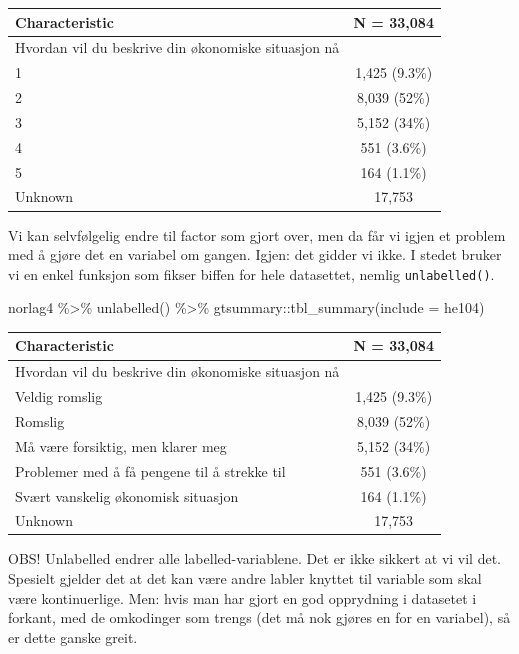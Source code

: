\documentclass[
  letterpaper,
  DIV=11,
  numbers=noendperiod]{scrreprt}
\newenvironment{Shaded}{\begin{snugshade}}{\end{snugshade}}
\newcommand{\AttributeTok}[1]{\textcolor[rgb]{0.40,0.45,0.13}{#1}}
\newcommand{\FunctionTok}[1]{\textcolor[rgb]{0.28,0.35,0.67}{#1}}
\newcommand{\NormalTok}[1]{\textcolor[rgb]{0.00,0.23,0.31}{#1}}
\newcommand{\SpecialCharTok}[1]{\textcolor[rgb]{0.37,0.37,0.37}{#1}}
\begin{document}
\begin{longtable}[]{@{}lc@{}}
\toprule()
\textbf{Characteristic} & \textbf{N = 33,084} \\
\midrule()
\endhead
Hvordan vil du beskrive din økonomiske situasjon nå & \\
1 & 1,425 (9.3\%) \\
2 & 8,039 (52\%) \\
3 & 5,152 (34\%) \\
4 & 551 (3.6\%) \\
5 & 164 (1.1\%) \\
Unknown & 17,753 \\
\bottomrule()
\end{longtable}

Vi kan selvfølgelig endre til factor som gjort over, men da får vi igjen
et problem med å gjøre det en variabel om gangen. Igjen: det gidder vi
ikke. I stedet bruker vi en enkel funksjon som fikser biffen for hele
datasettet, nemlig \texttt{unlabelled()}.

\begin{Shaded}
\begin{Highlighting}[]
\NormalTok{norlag4 }\SpecialCharTok{\%\textgreater{}\%} 
  \FunctionTok{unlabelled}\NormalTok{() }\SpecialCharTok{\%\textgreater{}\%} 
\NormalTok{  gtsummary}\SpecialCharTok{::}\FunctionTok{tbl\_summary}\NormalTok{(}\AttributeTok{include =}\NormalTok{ he104)}
\end{Highlighting}
\end{Shaded}

\begin{longtable}[]{@{}lc@{}}
\toprule()
\textbf{Characteristic} & \textbf{N = 33,084} \\
\midrule()
\endhead
Hvordan vil du beskrive din økonomiske situasjon nå & \\
Veldig romslig & 1,425 (9.3\%) \\
Romslig & 8,039 (52\%) \\
Må være forsiktig, men klarer meg & 5,152 (34\%) \\
Problemer med å få pengene til å strekke til & 551 (3.6\%) \\
Svært vanskelig økonomisk situasjon & 164 (1.1\%) \\
Unknown & 17,753 \\
\bottomrule()
\end{longtable}

OBS! Unlabelled endrer alle labelled-variablene. Det er ikke sikkert at
vi vil det. Spesielt gjelder det at det kan være andre labler knyttet
til variable som skal være kontinuerlige. Men: hvis man har gjort en god
opprydning i datasetet i forkant, med de omkodinger som trengs (det må
nok gjøres en for en variabel), så er dette ganske greit.
\end{document}
